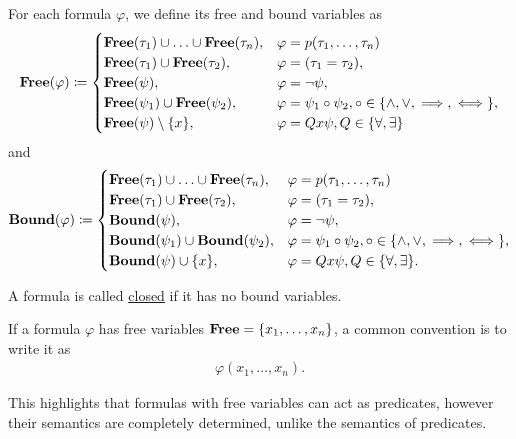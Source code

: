 \begin{definition}
  For each formula $\varphi$, we define its free and bound variables as
  \begin{align*}
    \operatorname{\mathbf{Free}}(\varphi) \coloneqq \begin{cases}
      \operatorname{\mathbf{Free}}(\tau_1) \cup \ldots \cup \operatorname{\mathbf{Free}}(\tau_n), &\varphi = p(\tau_1, \ldots, \tau_n) \\
      \operatorname{\mathbf{Free}}(\tau_1) \cup \operatorname{\mathbf{Free}}(\tau_2),             &\varphi = (\tau_1 = \tau_2), \\
      \operatorname{\mathbf{Free}}(\psi),                                        &\varphi = \neg \psi, \\
      \operatorname{\mathbf{Free}}(\psi_1) \cup \operatorname{\mathbf{Free}}(\psi_2),             &\varphi = \psi_1 \circ \psi_2, \circ \in \{ \land, \lor, \implies, \iff \}, \\
      \operatorname{\mathbf{Free}}(\psi) \setminus \{ x \},                      &\varphi = Q x \psi, Q \in \{ \forall, \exists \}
    \end{cases}
  \end{align*}
  and
  \begin{align*}
    \operatorname{\mathbf{Bound}}(\varphi) \coloneqq \begin{cases}
      \operatorname{\mathbf{Free}}(\tau_1) \cup \ldots \cup \operatorname{\mathbf{Free}}(\tau_n), &\varphi = p(\tau_1, \ldots, \tau_n) \\
      \operatorname{\mathbf{Free}}(\tau_1) \cup \operatorname{\mathbf{Free}}(\tau_2),             &\varphi = (\tau_1 = \tau_2), \\
      \operatorname{\mathbf{Bound}}(\psi),                                       &\varphi = \neg \psi, \\
      \operatorname{\mathbf{Bound}}(\psi_1) \cup \operatorname{\mathbf{Bound}}(\psi_2),           &\varphi = \psi_1 \circ \psi_2, \circ \in \{ \land, \lor, \implies, \iff \}, \\
      \operatorname{\mathbf{Bound}}(\psi) \cup \{ x \},                          &\varphi = Q x \psi, Q \in \{ \forall, \exists \}.
    \end{cases}
  \end{align*}

  A formula is called \uline{closed} if it has no bound variables.

  If a formula $\varphi$ has free variables $\operatorname{\mathbf{Free}} = \{ x_1, \ldots, x_n \}$, a common convention is to write it as
  \begin{align*}
    \varphi(x_1, \ldots, x_n).
  \end{align*}

  This highlights that formulas with free variables can act as predicates, however their semantics are completely determined, unlike the semantics of predicates.
\end{definition}

